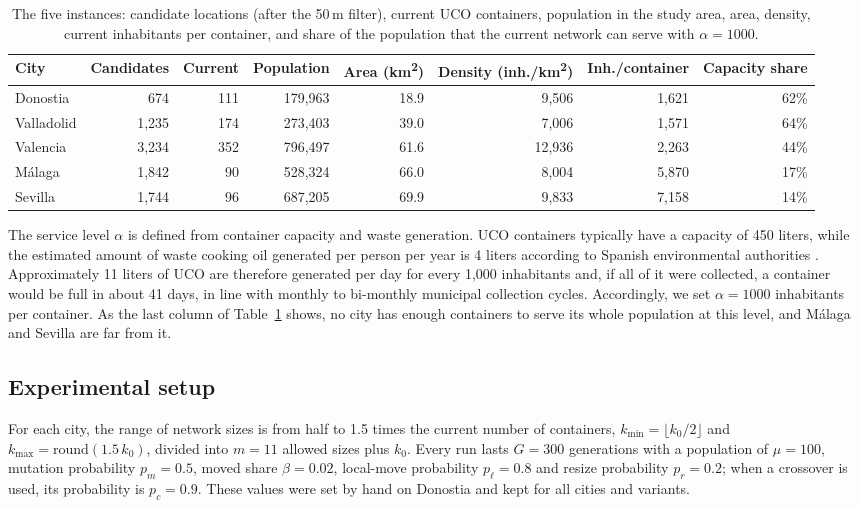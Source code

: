 \begin{table}[htbp]
\caption{The five instances: candidate locations (after the 50\,m filter), current UCO containers, population in the study area, area, density, current inhabitants per container, and share of the population that the current network can serve with $\alpha = 1000$.}
\centering
\small
\label{city_summary}
\begin{tabular}{lrrrrrrr}
\toprule
\textbf{City} & \textbf{Candidates} & \textbf{Current} & \textbf{Population} & \textbf{Area (km\textsuperscript{2})} & \textbf{Density (inh./km\textsuperscript{2})} & \textbf{Inh./container} & \textbf{Capacity share} \\
\midrule
Donostia   & 674  & 111 & 179,963 & 18.9 & 9,506  & 1,621 & 62\% \\
Valladolid & 1,235 & 174 & 273,403 & 39.0 & 7,006  & 1,571 & 64\% \\
Valencia   & 3,234 & 352 & 796,497 & 61.6 & 12,936 & 2,263 & 44\% \\
Málaga     & 1,842 & 90  & 528,324 & 66.0 & 8,004  & 5,870 & 17\% \\
Sevilla    & 1,744 & 96  & 687,205 & 69.9 & 9,833  & 7,158 & 14\% \\
\bottomrule
\end{tabular}
\end{table}

The service level $\alpha$ is defined from container capacity and waste generation. UCO containers typically have a capacity of 450 liters, while the estimated amount of waste cooking oil generated per person per year is 4 liters according to Spanish environmental authorities \cite{miteco}. Approximately 11 liters of UCO are therefore generated per day for every 1,000 inhabitants and, if all of it were collected, a container would be full in about 41 days, in line with monthly to bi-monthly municipal collection cycles. Accordingly, we set $\alpha = 1000$ inhabitants per container. As the last column of Table~\ref{city_summary} shows, no city has enough containers to serve its whole population at this level, and Málaga and Sevilla are far from it.

\subsection{Experimental setup}
For each city, the range of network sizes is from half to 1.5 times the current number of containers, $k_{\min} = \lfloor k_0/2 \rfloor$ and $k_{\max} = \mathrm{round}(1.5\, k_0)$, divided into $m = 11$ allowed sizes plus $k_0$. Every run lasts $G = 300$ generations with a population of $\mu = 100$, mutation probability $p_m = 0.5$, moved share $\beta = 0.02$, local-move probability $p_\ell = 0.8$ and resize probability $p_r = 0.2$; when a crossover is used, its probability is $p_c = 0.9$. These values were set by hand on Donostia and kept for all cities and variants.

